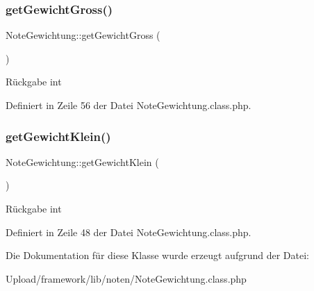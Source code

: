 \subsubsection{\texorpdfstring{get\+Gewicht\+Gross()}{getGewichtGross()}}
{\footnotesize\ttfamily Note\+Gewichtung\+::get\+Gewicht\+Gross (\begin{DoxyParamCaption}{ }\end{DoxyParamCaption})}

\begin{DoxyReturn}{Rückgabe}
int 
\end{DoxyReturn}


Definiert in Zeile 56 der Datei Note\+Gewichtung.\+class.\+php.

\mbox{\label{class_note_gewichtung_a3db16bd34477a30b7c99164a622227e7}} 
\subsubsection{\texorpdfstring{get\+Gewicht\+Klein()}{getGewichtKlein()}}
{\footnotesize\ttfamily Note\+Gewichtung\+::get\+Gewicht\+Klein (\begin{DoxyParamCaption}{ }\end{DoxyParamCaption})}

\begin{DoxyReturn}{Rückgabe}
int 
\end{DoxyReturn}


Definiert in Zeile 48 der Datei Note\+Gewichtung.\+class.\+php.



Die Dokumentation für diese Klasse wurde erzeugt aufgrund der Datei\+:\begin{DoxyCompactItemize}
\item 
Upload/framework/lib/noten/Note\+Gewichtung.\+class.\+php\end{DoxyCompactItemize}
